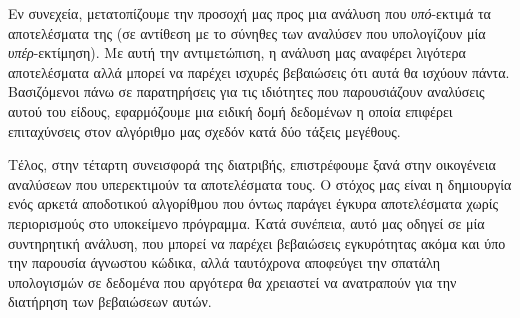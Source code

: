 Εν συνεχεία, μετατοπίζουμε την προσοχή μας προς μια ανάλυση που \emph{υπό}-εκτιμά τα αποτελέσματα της (σε αντίθεση με το σύνηθες των αναλύσεν που υπολογίζουν μία \emph{υπέρ}-εκτίμηση). Με αυτή την αντιμετώπιση, η ανάλυση μας αναφέρει λιγότερα αποτελέσματα αλλά μπορεί να παρέχει ισχυρές βεβαιώσεις ότι αυτά θα ισχύουν πάντα. Βασιζόμενοι πάνω σε παρατηρήσεις για τις ιδιότητες που παρουσιάζουν αναλύσεις αυτού του είδους, εφαρμόζουμε μια ειδική δομή δεδομένων η οποία επιφέρει επιταχύνσεις στον αλγόριθμο μας σχεδόν κατά δύο τάξεις μεγέθους.

Τέλος, στην τέταρτη συνεισφορά της διατριβής, επιστρέφουμε ξανά στην οικογένεια αναλύσεων που υπερεκτιμούν τα αποτελέσματα τους. Ο στόχος μας είναι η δημιουργία ενός αρκετά αποδοτικού αλγορίθμου που όντως παράγει έγκυρα αποτελέσματα χωρίς περιορισμούς στο υποκείμενο πρόγραμμα. Κατά συνέπεια, αυτό μας οδηγεί σε μία συντηρητική ανάλυση, που μπορεί να παρέχει βεβαιώσεις εγκυρότητας ακόμα και ύπο την παρουσία άγνωστου κώδικα, αλλά ταυτόχρονα αποφεύγει την σπατάλη υπολογισμών σε δεδομένα που αργότερα θα χρειαστεί να ανατραπούν για την διατήρηση των βεβαιώσεων αυτών.